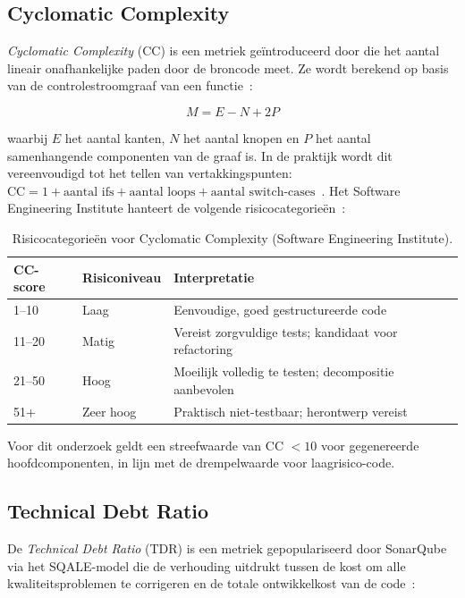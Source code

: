 \subsection{Cyclomatic Complexity}
\label{subsec:cyclomatic-complexity}

\textit{Cyclomatic Complexity} (CC) is een metriek geïntroduceerd door \textcite{McCabe1976} die het aantal lineair onafhankelijke paden door de broncode meet. Ze wordt berekend op basis van de controlestroomgraaf van een functie~\autocite{WikipediaCC}:

\[
M = E - N + 2P
\]

waarbij \(E\) het aantal kanten, \(N\) het aantal knopen en \(P\) het aantal samenhangende componenten van de graaf is. In de praktijk wordt dit vereenvoudigd tot het tellen van vertakkingspunten: \(\text{CC} = 1 + \text{aantal ifs} + \text{aantal loops} + \text{aantal switch-cases}\)~\autocite{Klocwork2024}. Het Software Engineering Institute hanteert de volgende risicocategorieën~\autocite{Sourcegraph2025}:

\begin{table}[h]
\small
\begin{tabularx}{\textwidth}{|l|l|X|}
\hline
\textbf{CC-score} & \textbf{Risiconiveau} & \textbf{Interpretatie} \\ \hline
1--10 & Laag & Eenvoudige, goed gestructureerde code \\ \hline
11--20 & Matig & Vereist zorgvuldige tests; kandidaat voor refactoring \\ \hline
21--50 & Hoog & Moeilijk volledig te testen; decompositie aanbevolen \\ \hline
51+ & Zeer hoog & Praktisch niet-testbaar; herontwerp vereist \\ \hline
\end{tabularx}
\caption{Risicocategorieën voor Cyclomatic Complexity (Software Engineering Institute).}
\label{tab:cyclomatic-complexity}
\end{table}

Voor dit onderzoek geldt een streefwaarde van CC \(< 10\) voor gegenereerde hoofdcomponenten, in lijn met de drempelwaarde voor laagrisico-code.

\subsection{Technical Debt Ratio}
\label{subsec:tdr}

De \textit{Technical Debt Ratio} (TDR) is een metriek gepopulariseerd door SonarQube via het SQALE-model die de verhouding uitdrukt tussen de kost om alle kwaliteitsproblemen te corrigeren en de totale ontwikkelkost van de code~\autocite{SonarDocs2025}:

